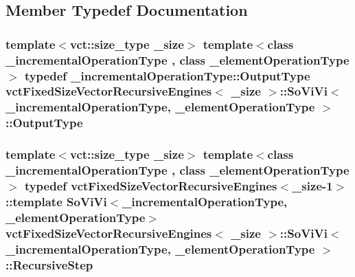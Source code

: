 \subsection{Member Typedef Documentation}
\hypertarget{classvct_fixed_size_vector_recursive_engines_1_1_so_vi_vi_a6d0b7f027e001b57489dcc1314ea016e}{
\subsubsection[{Output\-Type}]{\setlength{\rightskip}{0pt plus 5cm}template$<$vct\-::size\-\_\-type \-\_\-size$>$ template$<$class \-\_\-incremental\-Operation\-Type , class \-\_\-element\-Operation\-Type $>$ typedef \-\_\-incremental\-Operation\-Type\-::\-Output\-Type {\bf vct\-Fixed\-Size\-Vector\-Recursive\-Engines}$<$ \-\_\-size $>$\-::{\bf So\-Vi\-Vi}$<$ \-\_\-incremental\-Operation\-Type, \-\_\-element\-Operation\-Type $>$\-::{\bf Output\-Type}}}\label{classvct_fixed_size_vector_recursive_engines_1_1_so_vi_vi_a6d0b7f027e001b57489dcc1314ea016e}
\hypertarget{classvct_fixed_size_vector_recursive_engines_1_1_so_vi_vi_a75d4db74016f41d3bd1888e53f95f819}{
\subsubsection[{Recursive\-Step}]{\setlength{\rightskip}{0pt plus 5cm}template$<$vct\-::size\-\_\-type \-\_\-size$>$ template$<$class \-\_\-incremental\-Operation\-Type , class \-\_\-element\-Operation\-Type $>$ typedef {\bf vct\-Fixed\-Size\-Vector\-Recursive\-Engines}$<$\-\_\-size-\/1$>$\-::template {\bf So\-Vi\-Vi}$<$\-\_\-incremental\-Operation\-Type, \-\_\-element\-Operation\-Type$>$ {\bf vct\-Fixed\-Size\-Vector\-Recursive\-Engines}$<$ \-\_\-size $>$\-::{\bf So\-Vi\-Vi}$<$ \-\_\-incremental\-Operation\-Type, \-\_\-element\-Operation\-Type $>$\-::{\bf Recursive\-Step}}}\label{classvct_fixed_size_vector_recursive_engines_1_1_so_vi_vi_a75d4db74016f41d3bd1888e53f95f819}



